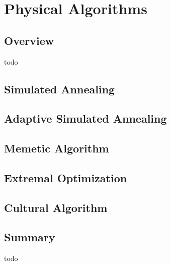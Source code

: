 


\chapter{Physical Algorithms}
\label{ch:physical}

\section{Overview}
todo


\section{Simulated Annealing}
\section{Adaptive Simulated Annealing}
\section{Memetic Algorithm}
\section{Extremal Optimization}
\section{Cultural Algorithm}


\section{Summary}
todo
